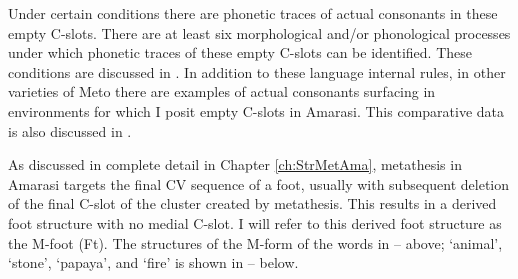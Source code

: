 Under certain conditions there are phonetic traces of actual consonants in these empty C-slots.
There are at least six morphological and/or phonological processes under
which phonetic traces of these empty C-slots can be identified.
These conditions are discussed in .
In addition to these language internal rules,
in other varieties of Meto there are
examples of actual consonants surfacing in environments
for which I posit empty C-slots in Amarasi.
This comparative data is also discussed in .

As discussed in complete detail in Chapter \ref{ch:StrMetAma},
metathesis in Amarasi targets the final
CV sequence of a foot, usually with subsequent
deletion of the final C-slot of the cluster created by metathesis.
This results in a derived foot structure with no medial C-slot.
I will refer to this derived foot structure as the M-foot (Ft).
The structures of the M-form of the words in -- above;
 {\ra}  `animal',  {\ra}  `stone',
 {\ra}  `papaya', and  {\ra}  `fire'
is shown in -- below.

